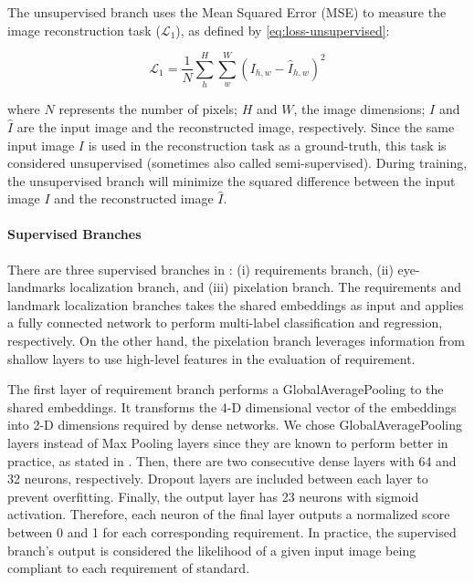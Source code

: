 The unsupervised branch uses the Mean Squared Error (MSE) to measure the image reconstruction task ($\mathcal{L}_1$), as defined by \autoref{eq:loss-unsupervised}:

\begin{equation}
\label{eq:loss-unsupervised}
\mathcal{L}_1 = \frac{1}{N} \sum_h^H \sum_w^W ({I_{h,w} - \hat{I}_{h,w}})^2
\end{equation}

\noindent where $N$ represents the number of pixels; $H$ and $W$, the image dimensions; $I$ and $\hat{I}$ are the input image and the reconstructed image, respectively. Since the same input image $I$ is used in the reconstruction task as a ground-truth, this task is considered unsupervised (sometimes also called semi-supervised). During training, the unsupervised branch will minimize the squared difference between the input image $I$ and the reconstructed image $\hat{I}$.

\paragraph{Supervised Branches} \label{sec:supervisedbranches}

There are three supervised branches in \methodname: (i) requirements branch, (ii) eye-landmarks localization branch, and (iii) pixelation branch. The requirements and landmark localization branches takes the shared embeddings as input and applies a fully connected network to perform multi-label classification and regression, respectively. On the other hand, the pixelation branch leverages information from shallow layers to use high-level features in the evaluation of \pixelation requirement. 

The first layer of requirement branch performs a GlobalAveragePooling to the shared embeddings. It transforms the 4-D dimensional vector of the embeddings into 2-D dimensions required by dense networks. We chose GlobalAveragePooling layers instead of Max Pooling layers since they are known to perform better in practice, as stated in \cite{zhou2016learning}. Then, there are two consecutive dense layers with 64 and 32 neurons, respectively. Dropout layers are included between each layer to prevent overfitting. Finally, the output layer has 23 neurons with sigmoid activation. Therefore, each neuron of the final layer outputs a normalized score between 0 and 1 for each corresponding requirement. In practice, the supervised branch's output is considered the likelihood of a given input image being compliant to each requirement of \icao standard.

